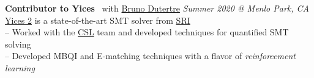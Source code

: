 \documentclass[line,margin,letter]{resume}
\begin{document}
\begin{resume}

    \textbf{Contributor to Yices}~ with \href{http://www.csl.sri.com/people/bruno/}{Bruno Dutertre} \hfill \emph{Summer 2020 @ Menlo Park, CA}\\ 
    \phantom{xx}\hspace{1ex} \href{https://github.com/SRI-CSL/yices2}{Yices 2} is a state-of-the-art SMT solver from \href{https://www.sri.com/}{SRI} \\
    \phantom{xx}\hspace{1ex} -- Worked with the \href{https://sri-csl.github.io/}{CSL} team and developed techniques for quantified SMT solving \\
    \phantom{xx}\hspace{1ex} -- Developed MBQI and E-matching techniques with a flavor of \textit{reinforcement learning}



\end{resume}
\end{document}
